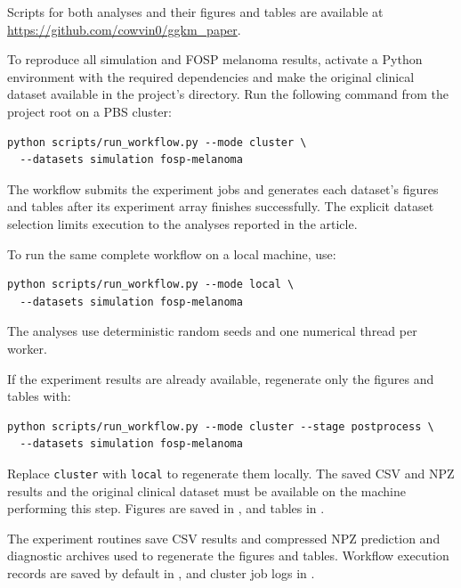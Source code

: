 \documentclass[11pt]{article}
\begin{document}
Scripts for both analyses and their figures and tables are available at \url{https://github.com/cowvin0/ggkm_paper}.

To reproduce all simulation and FOSP melanoma results, activate a Python environment with the required dependencies and make the original clinical dataset available in the project's  directory. Run the following command from the project root on a PBS cluster:
\begin{verbatim}
python scripts/run_workflow.py --mode cluster \
  --datasets simulation fosp-melanoma
\end{verbatim}
The workflow submits the experiment jobs and generates each dataset's figures and tables after its experiment array finishes successfully. The explicit dataset selection limits execution to the analyses reported in the article.

To run the same complete workflow on a local machine, use:
\begin{verbatim}
python scripts/run_workflow.py --mode local \
  --datasets simulation fosp-melanoma
\end{verbatim}

The analyses use deterministic random seeds and one numerical thread per worker.

If the experiment results are already available, regenerate only the figures and tables with:
\begin{verbatim}
python scripts/run_workflow.py --mode cluster --stage postprocess \
  --datasets simulation fosp-melanoma
\end{verbatim}
Replace \texttt{cluster} with \texttt{local} to regenerate them locally. The saved CSV and NPZ results and the original clinical dataset must be available on the machine performing this step. Figures are saved in , and tables in .

The experiment routines save CSV results and compressed NPZ prediction and diagnostic archives used to regenerate the figures and tables. Workflow execution records are saved by default in , and cluster job logs in .
\end{document}
